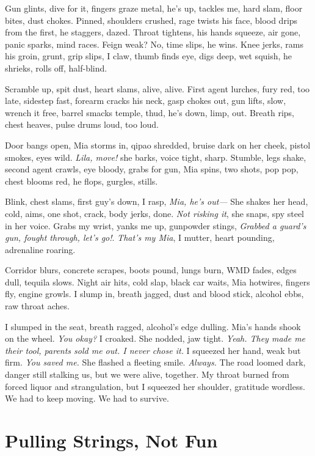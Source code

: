 \documentclass[12pt,oneside]{book} %
\begin{document}
Gun glints, dive for it, fingers graze metal, he’s up, tackles me, hard slam, floor bites, dust chokes. Pinned, shoulders crushed, rage twists his face, blood drips from the first, he staggers, dazed. Throat tightens, his hands squeeze, air gone, panic sparks, mind races. Feign weak? No, time slips, he wins. Knee jerks, rams his groin, grunt, grip slips, I claw, thumb finds eye, digs deep, wet squish, he shrieks, rolls off, half-blind.

Scramble up, spit dust, heart slams, alive, alive. First agent lurches, fury red, too late, sidestep fast, forearm cracks his neck, gasp chokes out, gun lifts, slow, wrench it free, barrel smacks temple, thud, he’s down, limp, out. Breath rips, chest heaves, pulse drums loud, too loud. 

Door bangs open, Mia storms in, qipao shredded, bruise dark on her cheek, pistol smokes, eyes wild. \textit{Lila, move!} she barks, voice tight, sharp. Stumble, legs shake, second agent crawls, eye bloody, grabs for gun, Mia spins, two shots, pop pop, chest blooms red, he flops, gurgles, stills. 

Blink, chest slams, first guy’s down, I rasp, \textit{Mia, he’s out—} She shakes her head, cold, aims, one shot, crack, body jerks, done. \textit{Not risking it}, she snaps, spy steel in her voice. Grabs my wrist, yanks me up, gunpowder stings, \textit{Grabbed a guard’s gun, fought through, let’s go!}. \textit{That's my Mia}, I mutter, heart pounding, adrenaline roaring.

Corridor blurs, concrete scrapes, boots pound, lungs burn, WMD fades, edges dull, tequila slows. Night air hits, cold slap, black car waits, Mia hotwires, fingers fly, engine growls. I slump in, breath jagged, dust and blood stick, alcohol ebbs, raw throat aches.

I slumped in the seat, breath ragged, alcohol’s edge dulling. Mia’s hands shook on the wheel. \textit{You okay?} I croaked. She nodded, jaw tight. \textit{Yeah. They made me their tool, parents sold me out. I never chose it.} I squeezed her hand, weak but firm. \textit{You saved me.} She flashed a fleeting smile. \textit{Always.} The road loomed dark, danger still stalking us, but we were alive, together. My throat burned from forced liquor and strangulation, but I squeezed her shoulder, gratitude wordless. We had to keep moving. We had to survive.

\chapter{Pulling Strings, Not Fun}
\end{document}
